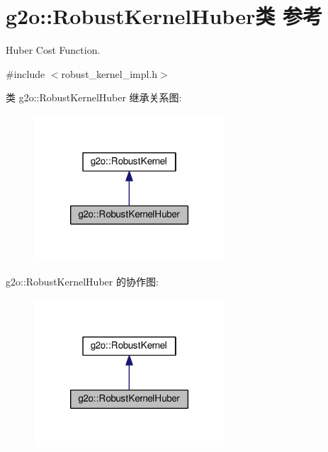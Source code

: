 \hypertarget{classg2o_1_1RobustKernelHuber}{\section{g2o\-:\-:Robust\-Kernel\-Huber类 参考}
\label{classg2o_1_1RobustKernelHuber}
}


Huber Cost Function.  




{\ttfamily \#include $<$robust\-\_\-kernel\-\_\-impl.\-h$>$}



类 g2o\-:\-:Robust\-Kernel\-Huber 继承关系图\-:
\nopagebreak
\begin{figure}[H]
\begin{center}
\leavevmode
\includegraphics[width=202pt]{classg2o_1_1RobustKernelHuber__inherit__graph}
\end{center}
\end{figure}


g2o\-:\-:Robust\-Kernel\-Huber 的协作图\-:
\nopagebreak
\begin{figure}[H]
\begin{center}
\leavevmode
\includegraphics[width=202pt]{classg2o_1_1RobustKernelHuber__coll__graph}
\end{center}
\end{figure}
